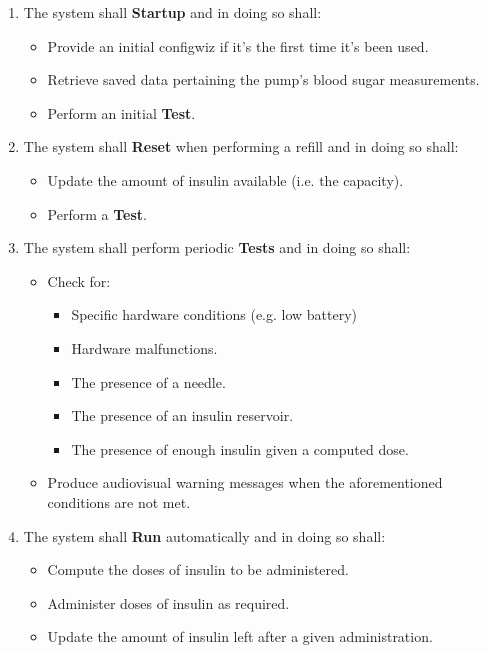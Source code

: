 \documentclass{scrreprt}
\begin{document}
\begin{enumerate}
  \item The system shall \textbf{Startup} and in doing so shall:
    \begin{itemize}
      \item Provide an initial \gls{configwiz} if it's the first time it's been used.
      \item Retrieve saved data pertaining the pump's blood sugar measurements.
      \item Perform an initial \textbf{Test}.
    \end{itemize}
  \item The system shall \textbf{Reset} when performing a refill and in doing so shall:
    \begin{itemize}
      \item Update the amount of \gls{insulin} available (i.e. the capacity).
      \item Perform a \textbf{Test}.
    \end{itemize}
  \item The system shall perform periodic \textbf{Tests} and in doing so shall:  
    \begin{itemize}
      \item Check for:
        \begin{itemize}
          \item Specific hardware conditions (e.g. low battery)
          \item Hardware malfunctions.
          \item The presence of a needle.
          \item The presence of an \gls{insulin} reservoir.
          \item The presence of enough \gls{insulin} given a computed dose.
        \end{itemize}
      \item Produce audiovisual warning messages when the aforementioned conditions are not met.
    \end{itemize}
  \item The system shall \textbf{Run} automatically and in doing so shall:
    \begin{itemize}
      \item Compute the doses of \gls{insulin} to be administered.
      \item Administer doses of \gls{insulin} as required.
      \item Update the amount of \gls{insulin} left after a given administration.

\end{itemize}
\end{enumerate}
\end{document}

